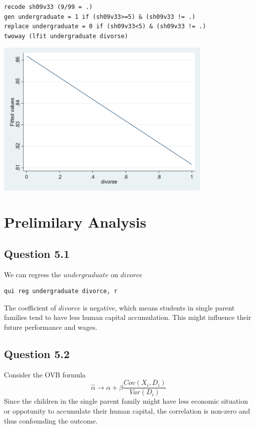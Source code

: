 \documentclass[11pt, letterpaper]{article}
\begin{document}
\begin{lstlisting}
recode sh09v33 (9/99 = .)
gen undergraduate = 1 if (sh09v33>=5) & (sh09v33 != .)
replace undergraduate = 0 if (sh09v33<5) & (sh09v33 != .)
twoway (lfit undergraduate divorse)
\end{lstlisting}
\includegraphics[height=3in]{twoway.png}


\section{Prelimilary Analysis}

\subsection*{Question 5.1}

We can regress the $\textit{undergraduate}$ on $\textit{divorce}$

\begin{lstlisting}
qui reg undergraduate divorce, r
\end{lstlisting}
The coefficient of $\textit{divorce}$ is negative, which means students in single parent families tend to have less human capital accumulation. This might influence their future performance and wages.


\subsection*{Question 5.2}

Consider the OVB formula 
\[
    \hat{\alpha} \to \alpha + \beta\frac{ Cov (X_i,D_i)}{ \textit{Var} (D_i)}
\]
Since the children in the single parent family might have less economic situation or oppotunity to accumulate their human capital, the correlation is non-zero and thus confounding the outcome.
\end{document}
